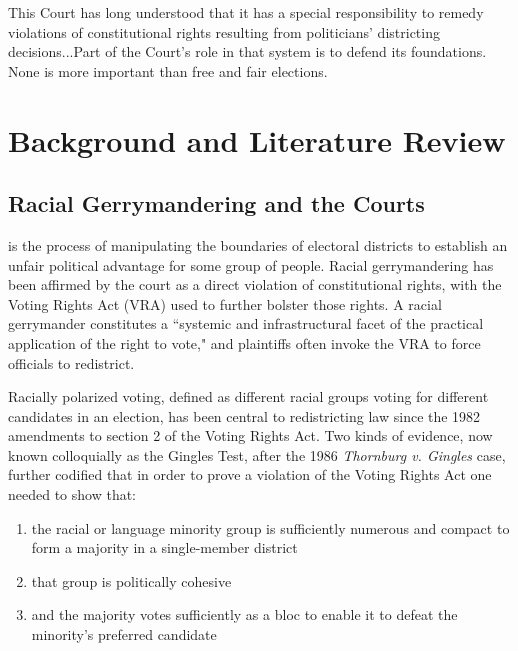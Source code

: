 \begin{savequote}[75mm]
This Court has long understood that it has a special responsibility to remedy violations of constitutional rights resulting from politicians' districting  decisions...Part of the Court's role in that system is  to  defend its foundations. None is more important than free and fair elections.
\end{savequote}

\chapter{Background and Literature Review}
\label{chap:background}

\section{Racial Gerrymandering and the Courts}

 is the process of manipulating the boundaries of electoral districts to establish an unfair political advantage for some group of people. Racial gerrymandering has been affirmed by the court as a direct violation of constitutional rights, with the Voting Rights Act (VRA) used to further bolster those rights. A racial gerrymander constitutes a ``systemic and infrastructural facet of the practical application of the right to vote,"\cite{greiner} and plaintiffs often invoke the VRA to force officials to redistrict.

Racially polarized voting, defined as different racial groups voting for different candidates in an election, has been central to redistricting law since the 1982 amendments to section 2 of the Voting Rights Act.\cite{greiner} Two kinds of evidence, now known colloquially as the Gingles Test, after the 1986 \textit{Thornburg v. Gingles}\cite{thornburg} case, further codified that in order to prove a violation of the Voting Rights Act one needed to show that:

\begin{enumerate}
 \item the racial or language minority group is sufficiently numerous and compact to form a majority in a single-member district
 \item that group is politically cohesive
 \item and the majority votes sufficiently as a bloc to enable it to defeat the minority’s preferred candidate
\end{enumerate}

